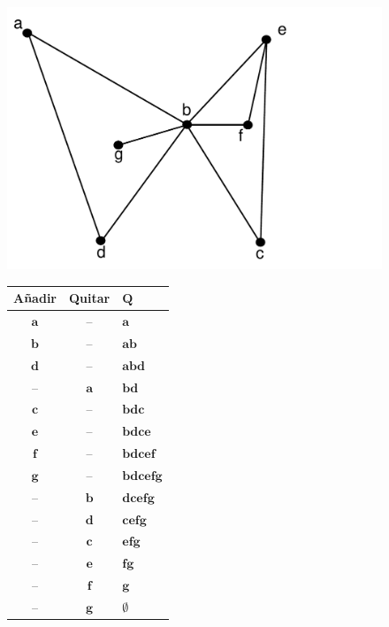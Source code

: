 \documentclass[ebook,oneside]{memoir}
\newcommand{\bolds}[1]{\boldsymbol{#1}}
\begin{document}
        \begin{center}
        \begin{figure}[h!]\centering
        \includegraphics[scale=0.2]{B2.pdf}
        \begin{minipage}{.4\textwidth}\begin{tabular}{|ccl|} \hline
            A\~nadir & Quitar & $\bolds{Q}$ \\ \hline
            $\bolds{a}$ & -- & $\bolds{a}$ \\
            $\bolds{b}$ & -- & $\bolds{ab}$ \\
            $\bolds{d}$ & -- & $\bolds{abd}$ \\
            -- & $\bolds{a}$ & $\bolds{bd}$ \\
            $\bolds{c}$ & -- & $\bolds{bdc}$ \\
            $\bolds{e}$ & -- & $\bolds{bdce}$ \\
            $\bolds{f}$ & -- & $\bolds{bdcef}$ \\
            $\bolds{g}$ & -- & $\bolds{bdcefg}$ \\
            -- & $\bolds{b}$ & $\bolds{dcefg}$ \\
            -- & $\bolds{d}$ & $\bolds{cefg}$ \\
            -- & $\bolds{c}$ & $\bolds{efg}$ \\
            -- & $\bolds{e}$ & $\bolds{fg}$ \\
            -- & $\bolds{f}$ & $\bolds{g}$ \\
            -- & $\bolds{g}$ & $\bolds{\emptyset}$ \\ \hline
        \end{tabular}\end{minipage}
        \end{figure}
        \end{center}
\end{document}
